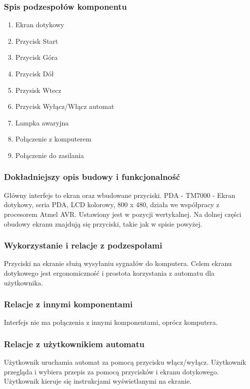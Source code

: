 \documentclass[12pt,a4paper,notitlepage]{article}
\begin{document}
\subsubsection{Spis podzespołów komponentu}
\begin{enumerate}
  \item Ekran dotykowy
  \item Przycisk Start
  \item Przycisk Góra
  \item Przycisk Dół
  \item Przysisk Wtecz
  \item Przycisk Wyłącz/Włącz automat
  \item Lampka awaryjna
  \item Połączenie z komputerem
  \item Połączenie do zasilania
\end{enumerate}

\subsubsection{Dokładniejszy opis budowy i funkcjonalność}
Główny interfejs to ekran oraz wbudowane przyciski. PDA - TM7000 -  Ekran dotykowy, seria PDA, LCD kolorowy, 800 x 480, działa we współpracy z procesorem Atmel AVR. Ustawiony jest w pozycji wertykalnej. Na dolnej części obudowy ekranu znajdują się przyciski, takie jak w spisie powyżej.
 
\subsubsection{Wykorzystanie i relacje z podzespołami}
Przyciski na ekranie służą wysyłaniu sygnałów do komputera. Celem ekranu dotykowego jest ergonomiczność i prostota korzystania z automatu dla użytkownika. 

\subsubsection{Relacje z innymi komponentami}
Interfejs nie ma połączenia z innymi komponentami, oprócz komputera.

\subsubsection{Relacje z użytkownikiem automatu}
Użytkownik uruchamia automat za pomocą przycisku włącz/wyłącz. Użytkownik przegląda i wybiera przepis za pomocą przycisków i ekranu dotykowego. Użytkownik kieruje się instrukcjami wyświetlanymi na ekranie.
\end{document}
